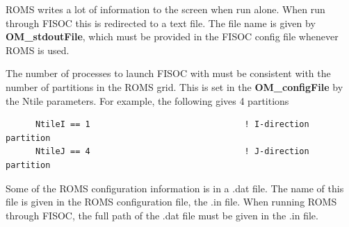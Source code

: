 \documentclass[12pt]{article}
\begin{document}
ROMS writes a lot of information to the screen when run alone.  
When run through FISOC this is redirected to a text file. 
The file name is given by \textbf{OM\_stdoutFile}, 
which must be provided in the FISOC config file 
whenever ROMS is used.

The number of processes to launch FISOC with must be consistent with the number of 
partitions in the ROMS grid.  This is set in the \textbf{OM\_configFile} by the 
Ntile parameters.  For example, the following gives 4 partitions
\begin{lstlisting}
      NtileI == 1                               ! I-direction partition
      NtileJ == 4                               ! J-direction partition
\end{lstlisting}

Some of the ROMS configuration information is in a .dat file.
The name of this file is given in the ROMS configuration file, the .in file.
When running ROMS through FISOC, the full path of the .dat file must be 
given in the .in file.


\end{document}

